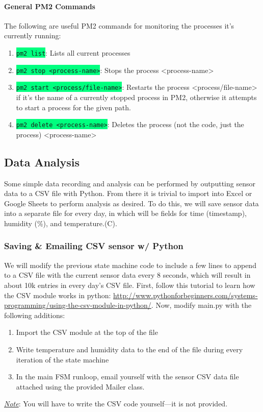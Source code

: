 \documentclass{article}
\newcommand{\codei}[1]{\colorbox{SpringGreen}{\texttt{#1}}} %
\newcommand{\note}[1]{\underline{\textit{Note}}: #1}
\begin{document}
    \paragraph{General PM2 Commands}
    The following are useful PM2 commands for monitoring the processes it's currently running:
    \begin{enumerate}
        \item \codei{pm2 list}: Lists all current processes
        \item \codei{pm2 stop <process-name>}: Stops the process <process-name>
        \item \codei{pm2 start <process/file-name>}: Restarts the process <process/file-name> if it's the name of a currently stopped process in PM2, otherwise it attempts to start a process for the given path.
        \item \codei{pm2 delete <process-name>}: Deletes the process (not the code, just the process) <process-name>
    \end{enumerate}


\subsection{Data Analysis}
Some simple data recording and analysis can be performed by outputting sensor data to a CSV file with Python. From there it is trivial to import into Excel or Google Sheets to perform analysis as desired. To do this, we will save sensor data into a separate file for every day, in which will be fields for time (timestamp), humidity (\%), and temperature.(\degree C).
  \subsubsection{Saving \& Emailing CSV sensor w/ Python}
  We will modify the previous state machine code to include a few lines to append to a CSV file with the current sensor data every 8 seconds, which will result in about 10k entries in every day's CSV file. First, follow this tutorial to learn how the CSV module works in python:
  \href{http://www.pythonforbeginners.com/systems-programming/using-the-csv-module-in-python/}{http://www.pythonforbeginners.com/systems-programming/using-the-csv-module-in-python/}.
  Now, modify main.py with the following additions:
  \begin{enumerate}
      \item Import the CSV module at the top of the file
      \item Write temperature and humidity data to the end of the file during every iteration of the state machine
      \item In the main FSM runloop, email yourself with the sensor CSV data file attached using the provided Mailer class.
  \end{enumerate}
  \note{You will have to write the CSV code yourself—it is not provided.}
\end{document}
